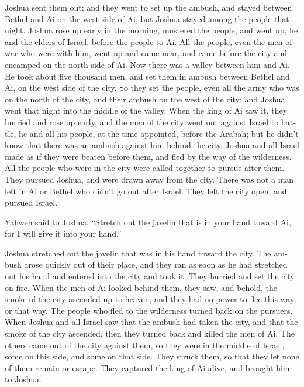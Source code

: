 \begin{paracol}{2}
\begin{otherlanguage}{english}
 Joshua sent them out; and they went to set up the ambush,
and stayed between Bethel and Ai on the west side of Ai; but Joshua
stayed among the people that night.  Joshua rose up early
in the morning, mustered the people, and went up, he and the elders of
Israel, before the people to Ai.  All the people, even
the men of war who were with him, went up and came near, and came before
the city and encamped on the north side of Ai. Now there was a valley
between him and Ai.  He took about five thousand men, and
set them in ambush between Bethel and Ai, on the west side of the city.
 So they set the people, even all the army who was on the
north of the city, and their ambush on the west of the city; and Joshua
went that night into the middle of the valley.  When the
king of Ai saw it, they hurried and rose up early, and the men of the
city went out against Israel to battle, he and all his people, at the
time appointed, before the Arabah; but he didn't know that there was an
ambush against him behind the city.  Joshua and all
Israel made as if they were beaten before them, and fled by the way of
the wilderness.  All the people who were in the city were
called together to pursue after them. They pursued Joshua, and were
drawn away from the city.  There was not a man left in Ai
or Bethel who didn't go out after Israel. They left the city open, and
pursued Israel.

 Yahweh said to Joshua, ``Stretch out the javelin that is
in your hand toward Ai, for I will give it into your hand.''

Joshua stretched out the javelin that was in his hand toward the city.
 The ambush arose quickly out of their place, and they
ran as soon as he had stretched out his hand and entered into the city
and took it. They hurried and set the city on fire.  When
the men of Ai looked behind them, they saw, and behold, the smoke of the
city ascended up to heaven, and they had no power to flee this way or
that way. The people who fled to the wilderness turned back on the
pursuers.  When Joshua and all Israel saw that the ambush
had taken the city, and that the smoke of the city ascended, then they
turned back and killed the men of Ai.  The others came
out of the city against them, so they were in the middle of Israel, some
on this side, and some on that side. They struck them, so that they let
none of them remain or escape.  They captured the king of
Ai alive, and brought him to Joshua.


\end{otherlanguage}
\end{paracol}
